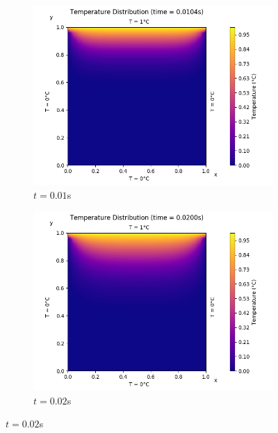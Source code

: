 \documentclass[a4paper]{article}
\begin{document}
		\begin{figure}[H]
			\begin{subfigure}{0.5\textwidth}
				\includegraphics[width=\linewidth]{figures/1a_explicit/1)t=10ms.png}
				\caption{$t = 0.01$s}
			\end{subfigure}\hspace*{\fill}
			\begin{subfigure}{0.5\textwidth}
				\includegraphics[width=\linewidth]{figures/1a_explicit/2)t=20ms.png}
				\caption{$t = 0.02$s}
			\end{subfigure}
			

\end{figure}
\end{document}
